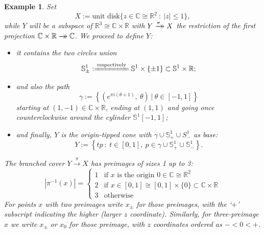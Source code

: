 \documentclass[11pt,leqno]{article}
\theoremstyle{plain}
\theoremstyle{plain}
\theoremstyle{plain}
\newtheorem{example}[lemma]{Example}
\numberwithin{equation}{section}
\theoremstyle{nonumberplain}
\newcommand\bC{{\mathbb C}}
\newcommand\bR{{\mathbb R}}
\newcommand\bS{{\mathbb S}}
\newcommand\1{{\bf 1}}
\newcommand{\xrightarrowdbl}[2][]{%
  \xrightarrow[#1]{#2}\mathrel{\mkern-14mu}\rightarrow
}
\begin{document}
\begin{example}\label{ex:3.sheeted.disk}
  Set
  \begin{equation*}
    X:=\text{unit disk}\{z\in \bC\cong \bR^2\ :\ |z|\le 1\},
  \end{equation*}
  while $Y$ will be a subspace of $\bR^3\cong \bC\times \bR$ with $Y\xrightarrowdbl{\pi}X$ the restriction of the first projection $\bC\times \bR\xrightarrowdbl{}\bC$. We proceed to define $Y$:
  \begin{itemize}[wide]
  \item it contains the two circles union
    \begin{equation*}
      \bS^1_{\pm}
      :\xlongequal{\text{respectively}}
      \bS^1\times \left\{\pm 1\right\}
      \subset
      \bS^1\times \bR;
    \end{equation*}
    
  \item and also the path
    \begin{equation}\label{eq:path.gamma}
      \gamma:=
      \left\{
        \left(e^{\pi i (\theta+1)},\ \theta\right)
        \ |\ \theta\in [-1,1]
      \right\}
    \end{equation}
    starting at $(1,-1)\in \bC\times \bR$, ending at $(1,1)$ and going once counterclockwise around the cylinder $\bS^1[-1,1]$;

  \item and finally, $Y$ is the origin-tipped cone with $\gamma\cup \bS^1_+\cup S^1_-$ as base:
    \begin{equation*}
      Y:=
      \left\{tp\ :\ t\in [0,1],\ p\in \gamma\cup \bS^1_+\cup \bS^1_-\right\}.
    \end{equation*}
  \end{itemize}
  The branched cover $Y\xrightarrow{\pi}X$ has preimages of sizes 1 up to 3:
  \begin{equation*}
    |\pi^{-1}(x)|=
    \begin{cases}
      1&\text{if $x$ is the origin }0\in\bC\cong \bR^2\\
      2&\text{if $x\in [0,1]\cong [0,1]\times \{0\}\subset \bC\times \bR$}\\
      3&\text{otherwise}
    \end{cases}
  \end{equation*}
  For points $x$ with two preimages write $x_{\pm}$ for those preimages, with the `$+$' subscript indicating the higher (larger $z$ coordinate). Similarly, for three-preimage $x$ we write $x_{\pm}$ or $x_0$ for those preimage, with $z$ coordinates ordered as $-<0<+$. 


\end{example}
\end{document}

